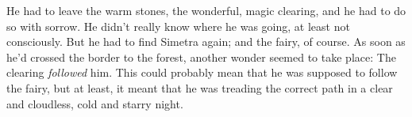 He had to leave the warm stones, the wonderful, magic clearing, and he had to do so with sorrow. He didn't really know where he was going, at least not consciously. But he had to find Simetra again; and the fairy, of course. 
As soon as he'd crossed the border to the forest, another wonder seemed to take place: The clearing \emph{followed} him. This could probably mean that he was supposed to follow the fairy, but at least, it meant that he was treading the correct path in a clear and cloudless, cold and starry night. 
